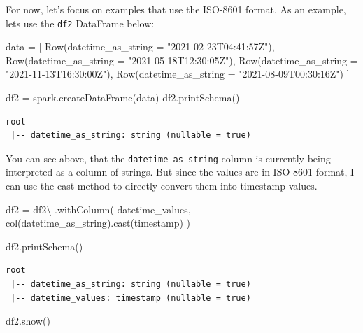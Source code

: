 \documentclass[
  11pt,
  letterpaper,
  DIV=11,
  numbers=noendperiod]{scrreprt}
\newenvironment{Shaded}{\begin{snugshade}}{\end{snugshade}}
\newcommand{\NormalTok}[1]{\textcolor[rgb]{0.00,0.23,0.31}{#1}}
\newcommand{\OperatorTok}[1]{\textcolor[rgb]{0.37,0.37,0.37}{#1}}
\newcommand{\StringTok}[1]{\textcolor[rgb]{0.13,0.47,0.30}{#1}}
\begin{document}
For now, let's focus on examples that use the ISO-8601 format. As an
example, lets use the \texttt{df2} DataFrame below:

\begin{Shaded}
\begin{Highlighting}[]
\NormalTok{data }\OperatorTok{=}\NormalTok{ [}
\NormalTok{    Row(datetime\_as\_string }\OperatorTok{=} \StringTok{"2021{-}02{-}23T04:41:57Z"}\NormalTok{),}
\NormalTok{    Row(datetime\_as\_string }\OperatorTok{=} \StringTok{"2021{-}05{-}18T12:30:05Z"}\NormalTok{),}
\NormalTok{    Row(datetime\_as\_string }\OperatorTok{=} \StringTok{"2021{-}11{-}13T16:30:00Z"}\NormalTok{),}
\NormalTok{    Row(datetime\_as\_string }\OperatorTok{=} \StringTok{"2021{-}08{-}09T00:30:16Z"}\NormalTok{)}
\NormalTok{]}

\NormalTok{df2 }\OperatorTok{=}\NormalTok{ spark.createDataFrame(data)}
\NormalTok{df2.printSchema()}
\end{Highlighting}
\end{Shaded}

\begin{verbatim}
root
 |-- datetime_as_string: string (nullable = true)
\end{verbatim}

You can see above, that the \texttt{datetime\_as\_string} column is
currently being interpreted as a column of strings. But since the values
are in ISO-8601 format, I can use the cast method to directly convert
them into timestamp values.

\begin{Shaded}
\begin{Highlighting}[]
\NormalTok{df2 }\OperatorTok{=}\NormalTok{ df2}\OperatorTok{\textbackslash{}}
\NormalTok{    .withColumn(}
        \StringTok{\textquotesingle{}datetime\_values\textquotesingle{}}\NormalTok{,}
\NormalTok{        col(}\StringTok{\textquotesingle{}datetime\_as\_string\textquotesingle{}}\NormalTok{).cast(}\StringTok{\textquotesingle{}timestamp\textquotesingle{}}\NormalTok{)}
\NormalTok{    )}

\NormalTok{df2.printSchema()}
\end{Highlighting}
\end{Shaded}

\begin{verbatim}
root
 |-- datetime_as_string: string (nullable = true)
 |-- datetime_values: timestamp (nullable = true)
\end{verbatim}

\begin{Shaded}
\begin{Highlighting}[]
\NormalTok{df2.show()}
\end{Highlighting}
\end{Shaded}
\end{document}
